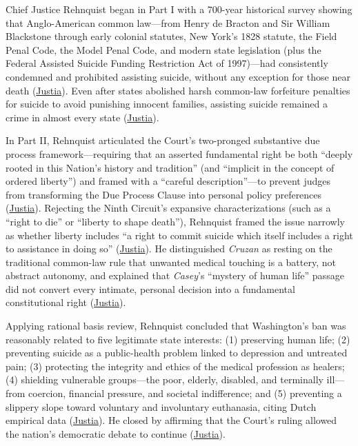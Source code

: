 \documentclass[12pt]{article}
\begin{document}
Chief Justice Rehnquist began in Part I with a 700-year historical survey showing that Anglo-American common law---from Henry de Bracton and Sir William Blackstone through early colonial statutes, New York's 1828 statute, the Field Penal Code, the Model Penal Code, and modern state legislation (plus the Federal Assisted Suicide Funding Restriction Act of 1997)---had consistently condemned and prohibited assisting suicide, without any exception for those near death (\href{https://supreme.justia.com/cases/federal/us/521/702/}{Justia}). Even after states abolished harsh common-law forfeiture penalties for suicide to avoid punishing innocent families, assisting suicide remained a crime in almost every state (\href{https://supreme.justia.com/cases/federal/us/521/702/}{Justia}).

In Part II, Rehnquist articulated the Court's two-pronged substantive due process framework---requiring that an asserted fundamental right be both ``deeply rooted in this Nation's history and tradition'' (and ``implicit in the concept of ordered liberty'') and framed with a ``careful description''---to prevent judges from transforming the Due Process Clause into personal policy preferences (\href{https://supreme.justia.com/cases/federal/us/521/702/}{Justia}). Rejecting the Ninth Circuit's expansive characterizations (such as a ``right to die'' or ``liberty to shape death''), Rehnquist framed the issue narrowly as whether liberty includes ``a right to commit suicide which itself includes a right to assistance in doing so'' (\href{https://supreme.justia.com/cases/federal/us/521/702/}{Justia}). He distinguished \textit{Cruzan} as resting on the traditional common-law rule that unwanted medical touching is a battery, not abstract autonomy, and explained that \textit{Casey}'s ``mystery of human life'' passage did not convert every intimate, personal decision into a fundamental constitutional right (\href{https://supreme.justia.com/cases/federal/us/521/702/}{Justia}).

Applying rational basis review, Rehnquist concluded that Washington's ban was reasonably related to five legitimate state interests: (1) preserving human life; (2) preventing suicide as a public-health problem linked to depression and untreated pain; (3) protecting the integrity and ethics of the medical profession as healers; (4) shielding vulnerable groups---the poor, elderly, disabled, and terminally ill---from coercion, financial pressure, and societal indifference; and (5) preventing a slippery slope toward voluntary and involuntary euthanasia, citing Dutch empirical data (\href{https://supreme.justia.com/cases/federal/us/521/702/}{Justia}). He closed by affirming that the Court's ruling allowed the nation's democratic debate to continue (\href{https://supreme.justia.com/cases/federal/us/521/702/}{Justia}).
\end{document}
